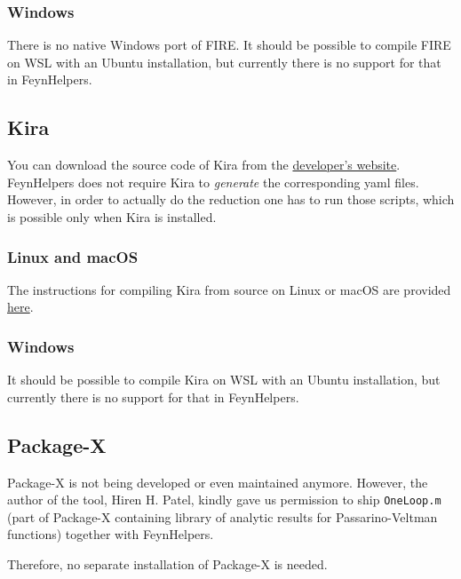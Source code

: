 \documentclass[../FeynHelpersManual.tex]{subfiles}
\begin{document}
\hypertarget{windows-1}{%
\subsubsection{Windows}\label{windows-1}}

There is no native Windows port of FIRE. It should be possible to
compile FIRE on WSL with an Ubuntu installation, but currently there is
no support for that in FeynHelpers.

\hypertarget{kira}{%
\subsection{Kira}\label{kira}}

You can download the source code of Kira from the
\href{https://gitlab.com/kira-pyred/kira}{developer's website}.
FeynHelpers does not require Kira to \emph{generate} the corresponding
yaml files. However, in order to actually do the reduction one has to
run those scripts, which is possible only when Kira is installed.

\hypertarget{linux-and-macos}{%
\subsubsection{Linux and macOS}\label{linux-and-macos}}

The instructions for compiling Kira from source on Linux or macOS are
provided \href{https://gitlab.com/kira-pyred/kira}{here}.

\hypertarget{windows-2}{%
\subsubsection{Windows}\label{windows-2}}

It should be possible to compile Kira on WSL with an Ubuntu
installation, but currently there is no support for that in FeynHelpers.

\hypertarget{package-x}{%
\subsection{Package-X}\label{package-x}}

Package-X is not being developed or even maintained anymore. However,
the author of the tool, Hiren H. Patel, kindly gave us permission to
ship \texttt{OneLoop.m} (part of Package-X containing library of
analytic results for Passarino-Veltman functions) together with
FeynHelpers.

Therefore, no separate installation of Package-X is needed.
\end{document}
